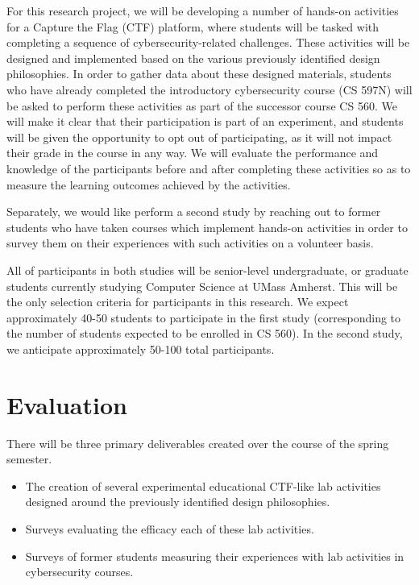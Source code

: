 \documentclass{article}
\begin{document}
    For this research project, we will be developing a number of hands-on activities for a Capture the Flag (CTF) platform, where students will be tasked with completing a sequence of cybersecurity-related challenges.
    These activities will be designed and implemented based on the various previously identified design philosophies. 
    In order to gather data about these designed materials, students who have already completed the introductory cybersecurity course (CS 597N) will be asked to perform these activities as part of the successor course CS 560.
    We will make it clear that their participation is part of an experiment, and students will be given the opportunity to opt out of participating, as it will not impact their grade in the course in any way.
    We will evaluate the performance and knowledge of the participants before and after completing these activities so as to measure the learning outcomes achieved by the activities. 

    Separately, we would like perform a second study by reaching out to former students who have taken courses which implement hands-on activities in order to survey them on their experiences with such activities on a volunteer basis. 

    All of participants in both studies will be senior-level undergraduate, or graduate students currently studying Computer Science at UMass Amherst. 
    This will be the only selection criteria for participants in this research. 
    We expect approximately 40-50 students to participate in the first study (corresponding to the number of students expected to be enrolled in CS 560).
    In the second study, we anticipate approximately 50-100 total participants. 

\section{Evaluation}

    There will be three primary deliverables created over the course of the spring semester.

    \begin{itemize}
        \item The creation of several experimental educational CTF-like lab activities designed around the previously identified design philosophies. 
        \item Surveys evaluating the efficacy each of these lab activities.\
        \item Surveys of former students measuring their experiences with lab activities in cybersecurity courses. 
    \end{itemize}
\end{document}
